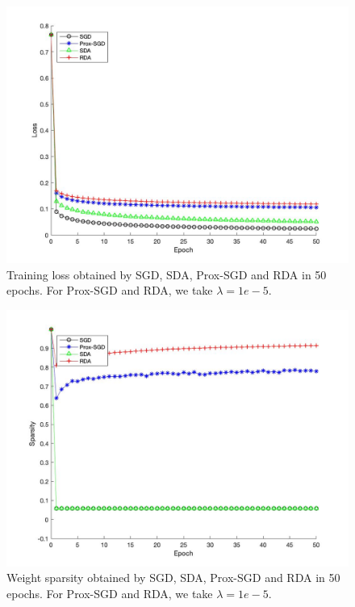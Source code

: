 \begin{figure}[H]
	\centering 
	\includegraphics[scale=0.2]{./figures/LR_Loss.jpg}
	\caption{Training loss obtained by SGD, SDA, Prox-SGD and RDA in 50 epochs. For Prox-SGD and RDA, we take $\lambda=1e-5$.}
	\label{RCV1Loss}
\end{figure}
\begin{figure}[H]
	\centering 
	\includegraphics[scale=0.2]{./figures/LR_Sparsity.jpg}
	\caption{Weight sparsity obtained by SGD, SDA, Prox-SGD and RDA in 50 epochs. For Prox-SGD and RDA, we take $\lambda=1e-5$.}
	\label{RCV1Sparsity}
\end{figure}
